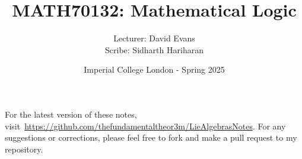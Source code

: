 \documentclass[a4paper, 12pt, openany, oneside]{book}
\title{\vspace{-2em}MATH70132: Mathematical Logic}
\author{Lecturer: David Evans \\ Scribe: Sidharth Hariharan}
\date{Imperial College London - Spring 2025}
\begin{document}
\setlength{\abovedisplayskip}{7.5pt}  %
\setlength{\belowdisplayskip}{7.5pt}  %
\setlength{\abovedisplayshortskip}{2pt}
\setlength{\belowdisplayshortskip}{2pt}

\maketitle
\thispagestyle{empty}

\tableofcontents
\thispagestyle{empty}

\newpage

\nocite{*}





% 

\newpage




\printbibliography[prenote=mybibnote]
\thispagestyle{empty}

For the latest version of these notes, visit~\url{https://github.com/thefundamentaltheor3m/LieAlgebrasNotes}. For any suggestions or corrections, please feel free to fork and make a pull request to my repository.
\end{document}
